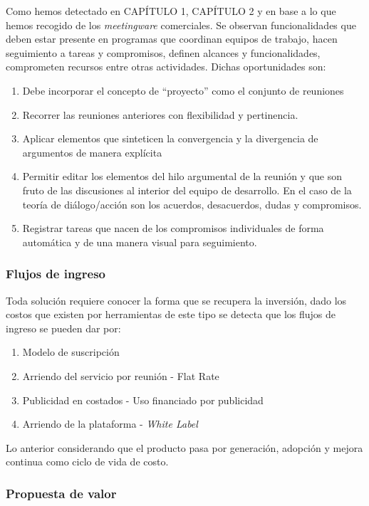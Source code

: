 Como hemos detectado en CAPÍTULO 1, CAPÍTULO 2 y en base a lo que hemos recogido de los \textit{meetingware} comerciales. Se observan funcionalidades que deben estar presente en programas que coordinan equipos de trabajo, hacen seguimiento a tareas y compromisos, definen alcances y funcionalidades, comprometen recursos entre otras actividades. Dichas oportunidades son:

\begin{enumerate}[1.]
	\item Debe incorporar el concepto de “proyecto” como el conjunto de reuniones
	\item Recorrer las reuniones anteriores con flexibilidad y pertinencia. 
	\item Aplicar elementos que sinteticen la convergencia y la divergencia de argumentos de manera explícita
	\item Permitir editar los elementos del hilo argumental de la reunión y que son fruto de las discusiones al interior del equipo de desarrollo. En el caso de la teoría de diálogo/acción son los acuerdos, desacuerdos, dudas y compromisos.
	\item Registrar tareas que nacen de los compromisos individuales de forma automática y de una manera visual para seguimiento.
\end{enumerate}

\subsubsection{Flujos de ingreso}

Toda solución requiere conocer la forma que se recupera la inversión, dado los costos que existen por herramientas de este tipo se detecta que los flujos de ingreso se pueden dar por: 

\begin{enumerate}[1.]
	\item Modelo de suscripción
	\item Arriendo del servicio por reunión - Flat Rate 
	\item Publicidad en costados - Uso financiado por publicidad
	\item Arriendo de la plataforma - \textit{White Label}
\end{enumerate}

Lo anterior considerando que el producto pasa por generación, adopción y mejora continua como ciclo de vida de costo.

\subsubsection{Propuesta de valor}

